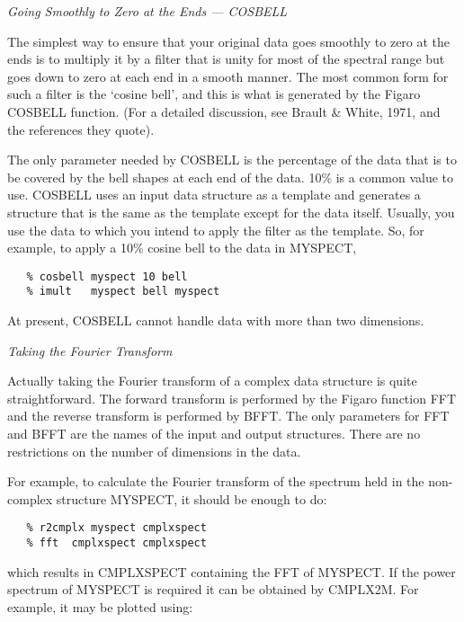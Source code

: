 \goodbreak
\vspace{12pt}
{\it Going Smoothly to Zero at the Ends --- COSBELL}

The simplest way to ensure that your original data goes smoothly
to zero at the ends is to multiply it by a filter that is unity for most
of the spectral range but goes down to zero at each end in a smooth 
manner.  The most common form for such a filter is the `cosine bell',
and this is what is generated by the Figaro COSBELL function.  (For a
detailed discussion, see Brault \& White, 1971, and the references they
quote).

The only parameter needed by COSBELL is the percentage of the
data that is to be covered by the bell shapes at each end of the
data.  10\% is a common value to use.  COSBELL uses an input data
structure as a template and generates a structure that is the same as
the template except for the data itself.  Usually, you use the data
to which you intend to apply the filter as the template.  So, for example,
to apply a 10\% cosine bell to the data in MYSPECT,

\begin{verbatim}
   % cosbell myspect 10 bell
   % imult   myspect bell myspect
\end{verbatim}

At present, COSBELL cannot handle data with more than two
dimensions.


\goodbreak
\vspace{12pt}
{\it Taking the Fourier Transform}

Actually taking the Fourier transform of a complex data structure
is quite straightforward.  The forward transform is performed
by the Figaro function FFT and the reverse transform is performed by
BFFT.  The only parameters for FFT and BFFT are the names of the input
and output structures.  There are no restrictions on the number of
dimensions in the data.

For example, to calculate the Fourier transform of the spectrum
held in the non-complex structure MY\-SPECT, it should be enough to do:

\begin{verbatim}
   % r2cmplx myspect cmplxspect
   % fft  cmplxspect cmplxspect
\end{verbatim}

which results in CMPLXSPECT containing the FFT of MY\-SPECT.  If the
power spectrum of MY\-SPECT is required it can be obtained by CMPLX2M.  
For example, it may be plotted using:

